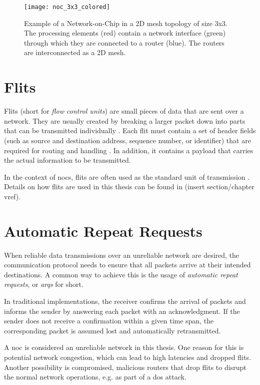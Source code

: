 \begin{figure}
    \centering
    \texttt{[image: noc\_3x3\_colored]}
    \caption[Example of a 3x3 mesh NoC]{Example of a Network-on-Chip in a 2D mesh topology of size 3x3. The processing elements (red) contain a network interface
    (green) through which they are connected to a router (blue). The routers are interconnected as a 2D mesh.}
    \label{fig:nocexample}
\end{figure}

\section{Flits}\label{sec:flits}
Flits (short for \textit{flow control units}) are small pieces of data that are sent over a network. They are usually created by breaking a larger
packet down into parts that can be transmitted individually \cite[6]{flitslecturecmu}. Each flit must contain a set of header fields (such as source and
destination address, sequence number, or identifier) that are required for routing and handling \cite[2]{flitslectureutah}. In addition, it contains
a payload that carries the actual information to be transmitted.

In the context of \glspl{noc}, flits are often used as the standard unit of transmission \cite[51\psqq]{tatas16designingnocs}. Details on how flits
are used in this thesis can be found in (insert section/chapter vref).

\section{Automatic Repeat Requests}\label{sec:arqs}
When reliable data transmissions over an unreliable network are desired, the communication protocol needs to ensure that all packets arrive at their
intended destinations. A common way to achieve this is the usage of \textit{automatic repeat requests}, or \textit{\glspl{arq}} for short.

In traditional implementations, the receiver confirms the arrival of packets and informs the sender by answering each packet with an acknowledgment.
If the sender does not receive a confirmation within a given time span, the corresponding packet is assumed lost and automatically retransmitted.

A \gls{noc} is considered an unreliable network in this thesis. One reason for this is potential network congestion, which can lead to high latencies
and dropped flits. Another possibility is compromised, malicious routers that drop flits to disrupt the normal network operations, e.g. as part of a
\gls{dos} attack.


